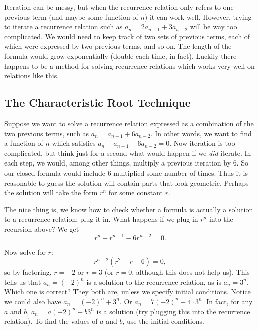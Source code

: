 \documentclass[10pt,]{book}
\theoremstyle{plain}
\theoremstyle{definition}
\theoremstyle{definition}
\theoremstyle{definition}
\numberwithin{equation}{chapter}
\begin{document}
Iteration can be messy, but when the recurrence relation only refers to one previous term (and maybe some function of \(n\)) it can work well. However, trying to iterate a recurrence relation such as \(a_n = 2 a_{n-1} + 3 a_{n-2}\) will be way too complicated. We would need to keep track of two sets of previous terms, each of which were expressed by two previous terms, and so on. The length of the formula would grow exponentially (double each time, in fact). Luckily there happens to be a method for solving recurrence relations which works very well on relations like this.
%
\typeout{************************************************}
\typeout{************************************************}
\subsection[The Characteristic Root Technique]{The Characteristic Root Technique}\label{subsection-22}
Suppose we want to solve a recurrence relation expressed as a combination of the two previous terms, such as \(a_n = a_{n-1} + 6a_{n-2}\). In other words, we want to find a function of \(n\) which satisfies \(a_n - a_{n-1} - 6a_{n-2} = 0\). Now iteration is too complicated, but think just for a second what would happen if we \emph{did} iterate. In each step, we would, among other things, multiply a previous iteration by 6. So our closed formula would include \(6\) multiplied some number of times. Thus it is reasonable to guess the solution will contain parts that look geometric. Perhaps the solution will take the form \(r^n\) for some constant \(r\).
%
\par

The nice thing is, we know how to check whether a formula is actually a solution to a recurrence relation: plug it in. What happens if we plug in \(r^n\) into the recursion above? We get
\begin{equation*}
  r^n - r^{n-1} - 6r^{n-2} = 0.
\end{equation*}
%
\par

Now solve for \(r\):
\begin{equation*}
  r^{n-2}(r^2 - r - 6) = 0,
\end{equation*}
so by factoring, \(r = -2\) or \(r = 3\) (or \(r = 0\), although this does not help us). This tells us that \(a_n = (-2)^n\) is a solution to the recurrence relation, as is \(a_n = 3^n\). Which one is correct? They both are, unless we specify initial conditions. Notice we could also have \(a_n = (-2)^n + 3^n\). Or \(a_n = 7(-2)^n + 4\cdot 3^n\). In fact, for any \(a\) and \(b\), \(a_n = a(-2)^n + b 3^n\) is a solution (try plugging this into the recurrence relation). To find the values of \(a\) and \(b\), use the initial conditions.
%
\par
\end{document}
